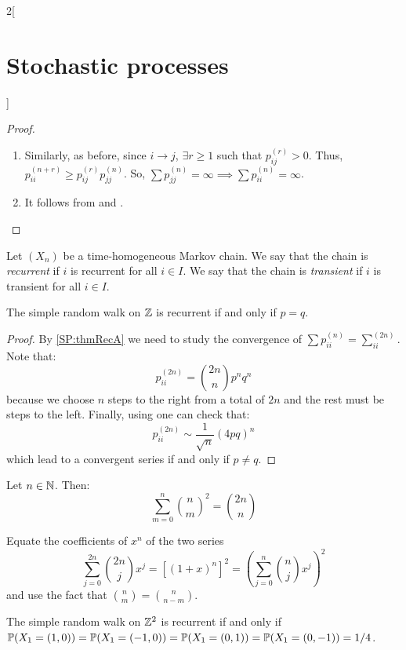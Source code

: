 \documentclass[../../../main_math.tex]{subfiles}
\begin{document}
\begin{multicols}{2}[\section{Stochastic processes}]
\begin{proof}
\begin{enumerate}
      \item Similarly, as before, since $i\to j$, $\exists r\geq 1$ such that $p_{ij}^{(r)}>0$. Thus, $p_{ii}^{(n+r)}\geq p_{ij}^{(r)}p_{jj}^{(n)}$. So, $\sum p_{jj}^{(n)}=\infty\implies \sum p_{ii}^{(n)} = \infty$.
      \item It follows from  and .
    \end{enumerate}
  \end{proof}
  \begin{definition}
    Let $(X_n)$ be a time-homogeneous Markov chain. We say that the chain is \emph{recurrent} if $i$ is recurrent for all $i\in I$. We say that the chain is \emph{transient} if $i$ is transient for all $i\in I$.
  \end{definition}
  \begin{theorem}
    The simple random walk on $\mathbb{Z}$ is recurrent if and only if $p=q$.
  \end{theorem}
  \begin{proof}
    By \cref{SP:thmRecA} we need to study the convergence of $\sum p_{ii}^{(n)}=\sum_{ii}^{(2n)}$. Note that:
    \begin{equation*}
      p_{ii}^{(2n)}=\binom{2n}{n}p^nq^n
    \end{equation*}
    because we choose $n$ steps to the right from a total of $2n$ and the rest must be steps to the left. Finally, using  one can check that:
    \begin{equation}\label{SP:stirling_polya1}
      p_{ii}^{(2n)}\sim \frac{1}{\sqrt{n}}{(4pq)}^n
    \end{equation}
    which lead to a convergent series if and only if $p\ne q$.
  \end{proof}
  \begin{lemma}\label{SP:2n-n_convinatoria}
    Let $n\in\mathbb{N}$. Then:
    $$
      \sum_{m=0}^{n}\binom{n}{m}^2=\binom{2n}{n}
    $$
  \end{lemma}
  \begin{sproof}
    Equate the coefficients of $x^n$ of the two series
    $$
      \sum_{j=0}^{2n}\binom{2n}{j}x^j={[{(1+x)}^{n}]}^2={\left(\sum_{j=0}^n\binom{n}{j}x^j\right)}^2
    $$
    and use the fact that $\binom{n}{m}=\binom{n}{n-m}$.
  \end{sproof}
  \begin{theorem}
    The simple random walk on $\mathbb{Z}^2$ is recurrent if and only if $\mathbb{P}(X_1=(1,0))=\mathbb{P}(X_1=(-1,0))=\mathbb{P}(X_1=(0,1))=\mathbb{P}(X_1=(0,-1))=1/4$.

\end{theorem}
\end{multicols}
\end{document}

